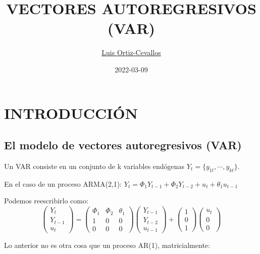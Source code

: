 \documentclass[
]{book}
\title{VECTORES AUTOREGRESIVOS (VAR)}
\author{\href{https://ortiz-cevallos.github.io/MYSELF/}{Luis Ortiz-Cevallos}}
\date{2022-03-09}
\begin{document}
\maketitle

{
\setcounter{tocdepth}{1}
\tableofcontents
}
\hypertarget{introducciuxf3n}{%
\chapter{INTRODUCCIÓN}\label{introducciuxf3n}}

\hypertarget{el-modelo-de-vectores-autoregresivos-var}{%
\section{El modelo de vectores autoregresivos (VAR)}\label{el-modelo-de-vectores-autoregresivos-var}}

Un VAR consiste en un conjunto de k variables endógenas \(Y_{t}=\{y_{1t},\cdots, y_{kt}\}\).

En el caso de un proceso ARMA(2,1):
\(Y_t = \Phi_1Y_{t-1} + \Phi_2Y_{t-2} + u_t + \theta_1u_{t-1}\)

Podemos reescribirlo como:
\begin{equation}
\left( \begin{array}{c}
Y_{t} \\
Y_{t-1} \\
u_{t} 
\end{array}
\right)=\left( \begin{array}{ccc}
\Phi_1 & \Phi_2 & \theta_1\\
1 & 0 & 0\\
0 & 0 & 0
\end{array}
\right) \left( \begin{array}{c}
Y_{t-1} \\
Y_{t-2} \\
u_{t-1} 
\end{array}
\right)+\left( \begin{array}{c}
1\\
0 \\
1
\end{array}
\right) \left( \begin{array}{c}
u_{t} \\
0 \\
0
\end{array}
\right) 
\nonumber
\end{equation}

Lo anterior no es otra cosa que un proceso AR(1), matricialmente:
\end{document}
